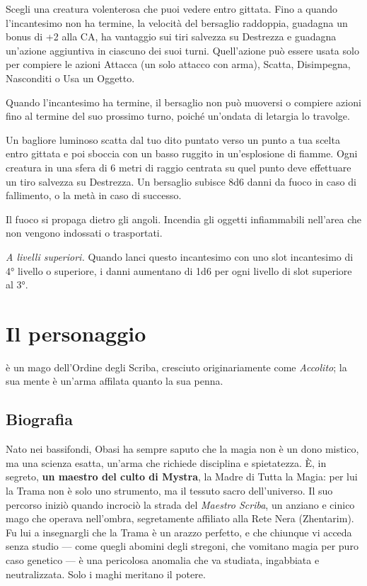 \documentclass[letterpaper,twocolumn,openany,nodeprecatedcode,justified]{dndbook}
\begin{document}

Scegli una creatura volenterosa che puoi vedere entro gittata. Fino a quando l'incantesimo non ha termine, la velocità del bersaglio raddoppia, guadagna un bonus di +2 alla CA, ha vantaggio sui tiri salvezza su Destrezza e guadagna un'azione aggiuntiva in ciascuno dei suoi turni. Quell'azione può essere usata solo per compiere le azioni Attacca (un solo attacco con arma), Scatta, Disimpegna, Nasconditi o Usa un Oggetto.

Quando l'incantesimo ha termine, il bersaglio non può muoversi o compiere azioni fino al termine del suo prossimo turno, poiché un'ondata di letargia lo travolge.


Un bagliore luminoso scatta dal tuo dito puntato verso un punto a tua scelta entro gittata e poi sboccia con un basso ruggito in un'esplosione di fiamme. Ogni creatura in una sfera di 6 metri di raggio centrata su quel punto deve effettuare un tiro salvezza su Destrezza. Un bersaglio subisce 8d6 danni da fuoco in caso di fallimento, o la metà in caso di successo.

Il fuoco si propaga dietro gli angoli. Incendia gli oggetti infiammabili nell'area che non vengono indossati o trasportati.

\emph{A livelli superiori.} Quando lanci questo incantesimo con uno slot incantesimo di 4° livello o superiore, i danni aumentano di 1d6 per ogni livello di slot superiore al 3°.

\chapter*{Il personaggio}

 è un mago dell'Ordine degli Scriba,
cresciuto originariamente come \emph{Accolito}; la sua mente è
un'arma affilata quanto la sua penna.

\section{Biografia}
Nato nei bassifondi, Obasi ha sempre saputo che la magia non è un dono
mistico, ma una scienza esatta, un'arma che richiede disciplina e
spietatezza. È, in segreto, \textbf{un maestro del culto di Mystra}, la
Madre di Tutta la Magia: per lui la Trama non è solo uno strumento, ma il
tessuto sacro dell'universo. Il suo percorso iniziò quando incrociò la
strada del \emph{Maestro Scriba}, un anziano e cinico mago che operava
nell'ombra, segretamente affiliato alla Rete Nera (Zhentarim). Fu lui a
insegnargli che la Trama è un arazzo perfetto, e che chiunque vi acceda
senza studio --- come quegli abomini degli stregoni, che vomitano magia
per puro caso genetico --- è una pericolosa anomalia che va studiata,
ingabbiata e neutralizzata. Solo i maghi meritano il potere.
\end{document}
